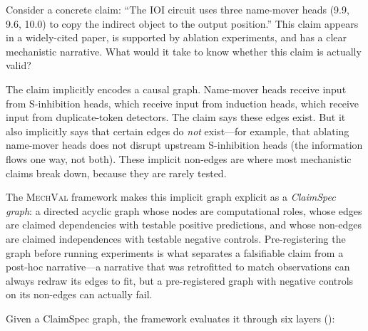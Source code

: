 \documentclass[10pt]{article}
\newcommand{\mechval}{\textsc{MechVal}}
\begin{document}
Consider a concrete claim: ``The IOI circuit uses three name-mover heads (9.9, 9.6, 10.0) to copy the indirect object to the output position.'' This claim appears in a widely-cited paper, is supported by ablation experiments, and has a clear mechanistic narrative. What would it take to know whether this claim is actually valid?

The claim implicitly encodes a causal graph. Name-mover heads receive input from S-inhibition heads, which receive input from induction heads, which receive input from duplicate-token detectors. The claim says these edges exist. But it also implicitly says that certain edges do \emph{not} exist---for example, that ablating name-mover heads does not disrupt upstream S-inhibition heads (the information flows one way, not both). These implicit non-edges are where most mechanistic claims break down, because they are rarely tested.


The \mechval{} framework makes this implicit graph explicit as a \emph{ClaimSpec graph}: a directed acyclic graph whose nodes are computational roles, whose edges are claimed dependencies with testable positive predictions, and whose non-edges are claimed independences with testable negative controls. Pre-registering the graph before running experiments is what separates a falsifiable claim from a post-hoc narrative---a narrative that was retrofitted to match observations can always redraw its edges to fit, but a pre-registered graph with negative controls on its non-edges can actually fail.

Given a ClaimSpec graph, the framework evaluates it through six layers ():
\end{document}
